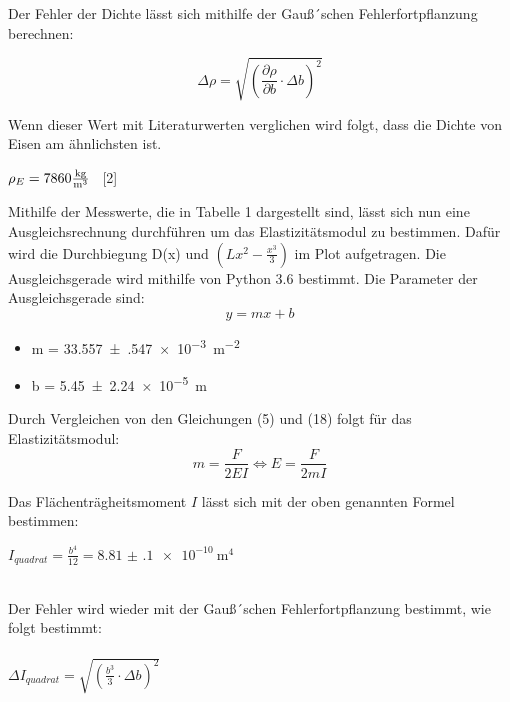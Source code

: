 Der Fehler der Dichte lässt sich mithilfe der Gauß´schen Fehlerfortpflanzung berechnen:

\begin{equation}
  \Delta \rho = \sqrt{\left(\frac{\partial\rho}{\partial b} \cdot \Delta b \right)^2}
\end{equation}

Wenn dieser Wert mit Literaturwerten verglichen wird folgt, dass die Dichte von Eisen
am ähnlichsten ist.\\
\centerline{$\rho_{E} = 7860 \si[per-mode=fraction]{\kilo\gram\per\metre\tothe{3}}$ \, [2]}


Mithilfe der Messwerte, die in Tabelle 1 dargestellt sind, lässt sich nun eine
Ausgleichsrechnung durchführen um das Elastizitätsmodul zu bestimmen. Dafür wird die
Durchbiegung D(x) und $\left( Lx^2- \frac{x^3}{3} \right)$ im Plot aufgetragen.
Die Ausgleichsgerade wird mithilfe von Python 3.6 bestimmt.
Die Parameter der Ausgleichsgerade sind:\\

\begin{equation}
  y=mx+b
\end{equation}

\begin{itemize}
  \item m = \SI{33.557(547)e-3}{\meter\tothe{-2}}
  \item b = \SI{5.45(224)e-5}{\meter}
\end{itemize}

Durch Vergleichen von den Gleichungen (5) und (18) folgt für das Elastizitätsmodul:\\

\begin{equation}
  m = \frac{F}{2EI} \iff E= \frac{F}{2mI}
\end{equation}

Das Flächenträgheitsmoment $I$ lässt sich mit der oben genannten Formel bestimmen:\\

\centerline{$I_{quadrat} = \frac{b^4}{12} = \SI{8.81(10)e-10}{\meter\tothe{4}}$}\ \\

Der Fehler wird wieder mit der Gauß´schen Fehlerfortpflanzung bestimmt, wie folgt bestimmt:\\\\

$\Delta I_{quadrat} = \sqrt{\left( \frac{b^3}{3} \cdot \Delta b\right)^2}$\\\\

